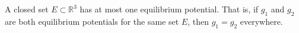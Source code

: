A closed set $E \subset \mathbb{R}^3$ has at most one equilibrium potential. That is, if $g_1$ and $g_2$ are both equilibrium potentials for the same set $E$, then $g_1 = g_2$ everywhere.
